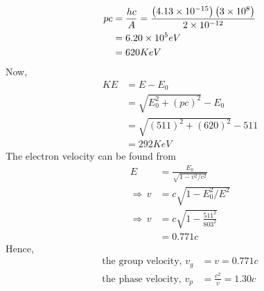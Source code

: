 \documentclass[../main.tex]{subfiles}
\begin{document}
\begin{soln}
    \begin{align*}
        pc&=\frac{hc}{A}=\frac{\left( 4.13\times 10^{-15} \right)\left( 3\times 10^{8} \right)}{2\times 10^{-12}}\\
        &=6.20\times 10^{5}eV\\
        &=620KeV
    \end{align*}
    Now,
    \begin{align*}
        KE&=E-E_0\\
        &=\sqrt{E_0^2+\left( pc \right)^2}-E_0\\
        &=\sqrt{(511)^2+\left( 620 \right)^2}-511\\
        &=292KeV
    \end{align*}
    The electron velocity can be found from
    \begin{align*}
        E&=\frac{E_0}{\sqrt{1-v^2/c^2}}\\
        \Rightarrow\,v&=c\sqrt{1-E_0^2/E^2}\\
        \Rightarrow\,v&=c\sqrt{1-\frac{511^2}{803^2}}\\
        &=0.771c
    \end{align*}
    Hence,
    \begin{align*}
        \text{the group velocity, } v_g&=v=0.771c\\
        \text{the phase velocity, } v_p&=\frac{c^2}{v}=1.30c
    \end{align*}
\end{soln}
\end{document}
